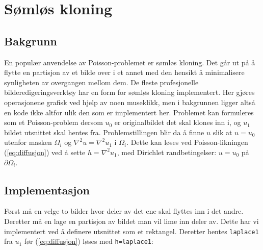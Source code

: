 \newpage
\section{Sømløs kloning}
\label{sec:kloning}
\subsection{Bakgrunn}
En populær anvendelse av Poisson-problemet er sømløs kloning. Det går ut på å flytte en partisjon av et bilde over i et annet med den hensikt å minimalisere synligheten av overgangen mellom dem. De fleste profesjonelle bilderedigeringsverktøy har en form for sømløs kloning implementert. Her gjøres operasjonene grafisk ved hjelp av noen museklikk, men i bakgrunnen ligger altså en kode ikke altfor ulik den som er implementert her.\newline
Problemet kan formuleres som et Poisson-problem dersom $u_0$ er originalbildet det skal klones inn i, og $u_1$ bildet utsnittet skal hentes fra. Problemstillingen blir da å finne $u$ slik at $u=u_0$ utenfor masken $\Omega_i$ og $\nabla^2 u = \nabla^2 u_1$ i $\Omega_i$. Dette kan løses ved Poisson-likningen (\ref{eq:diffusjon}) ved å sette $h=\nabla^2 u_1$, med Dirichlet randbetingelser: $u=u_0$ på $\partial \Omega_i$. 

\subsection{Implementasjon}
Først må en velge to bilder hvor deler av det ene skal flyttes inn i det andre. Deretter må en lage en partisjon av bildet man vil lime inn deler av. Dette har vi implementert ved å definere utsnittet som et rektangel. Deretter hentes \texttt{laplace1} fra $u_1$ før (\ref{eq:diffusjon}) løses med \texttt{h=laplace1}:

